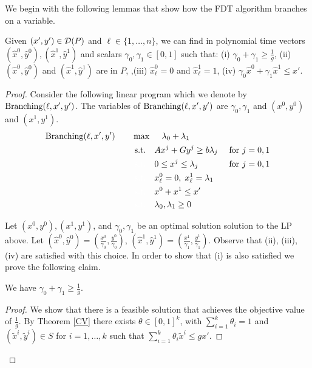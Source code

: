 \documentclass[runningheads]{llncs}
\begin{document}
We begin with the following lemmas that show how the FDT algorithm branches on a variable.
\begin{lemma}\label{LPClemma}
	Given $(x',y')\in \operatorname{\mathcal{D}}(P)$ and $\ell\in \{1,\ldots,n\}$, we can find in polynomial time vectors $(\hat{x}^0,\hat{y}^0),(\hat{x}^1,\hat{y}^1)$ and scalars $\gamma_0,\gamma_1 \in [0,1]$ such that: (i) $\gamma_0 + \gamma_1  \geq \frac{ 1}{g}$, (ii) $(\hat{x}^0,\hat{y}^0)$ and $(\hat{x}^1,\hat{y}^1)$ are in  $ P$, 
		,(iii) $\hat{x}^0_\ell=0$ and $\hat{x}^1_\ell=1$, (iv) $\gamma_0 \hat{x}^0 + \gamma_1\hat{x}^1 \leq x'$.
\end{lemma}


\begin{proof} 
	Consider the following linear program which we denote by $\operatorname{Branching}(\ell,x',y')$. The variables of $\operatorname{Branching}(\ell,x',y')$ are $\gamma_0,\gamma_1$ and $(x^0,y^0)$ and $(x^1,y^1)$. 
	\begin{align}
		\LPC(\ell,x',y')\quad\quad& \max\quad \;\lambda_0+\lambda_1\\
		&\;\text{s.t.} \quad Ax^j + Gy^j\geq b\lambda_j & \mbox{ for $j=0,1$} \label{feasibility}\\
		&\;{\color{white}{\text{s.t.}} }\quad 0 \leq x^j \leq \lambda_j &\mbox{ for $j=0,1$}\label{bound}\\
		&\;{\color{white}{\text{s.t.}} }\quad x^0_\ell = 0,\; x^1_\ell =\lambda_1\label{branchcoordinate}\\
		&\;{\color{white}{\text{s.t.}} }\quad x^0 + x^1 \leq x'\label{packing}\\
		&\;{\color{white}{\text{s.t.}} }\quad \lambda_0,\lambda_1 \geq 0
	\end{align}
	
	Let $(x^0,y^0),(x^1,y^1)$, and $\gamma_0,\gamma_1$ be an optimal solution solution to the LP above. Let $(\hat{x}^0,\hat{y}^0) = (\frac{x^0}{\gamma_0},\frac{y^0}{\gamma_0})$, $(\hat{x}^1,\hat{y}^1) = (\frac{x^1}{\gamma_1},\frac{y^1}{\gamma_1})$. Observe that  (ii), (iii), (iv) are satisfied with this choice. In order to show that (i) is also satisfied we prove the following claim.
	
	\begin{claim}\label{CVexists}
		We have $\gamma_0 + \gamma_1\geq \frac{1}{g}$.
	\end{claim}
	\begin{proof}
		We show that there is a feasible solution that achieves the objective value of $\frac{1}{g}$. By Theorem \ref{CV} there exists $\theta \in [0,1]^k$, with $\sum_{i=1}^{k}\theta_i = 1$ and $(\tilde{x}^i,\tilde{y}^i)\in S$ for $i=1,\ldots,k$ such that 
		$\sum_{i=1}^{k}\theta_i \tilde{x}^i\leq gx'$. 
		

\end{proof}
\end{proof}
\end{document}
